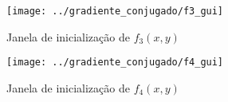 \begin{figure}[H]
	\begin{center}
		\texttt{[image: ../gradiente\_conjugado/f3\_gui]}   
		\caption{Janela de inicialização de $ f_3(x,y) $}
		\label{fig:gradiente_conjugado_f3_gui}
	\end{center}
\end{figure}


\begin{figure}[H]
	\begin{center}
		\texttt{[image: ../gradiente\_conjugado/f4\_gui]}   
		\caption{Janela de inicialização de $ f_4(x,y) $}
		\label{fig:gradiente_conjugado_f4_gui}
	\end{center}
\end{figure}
